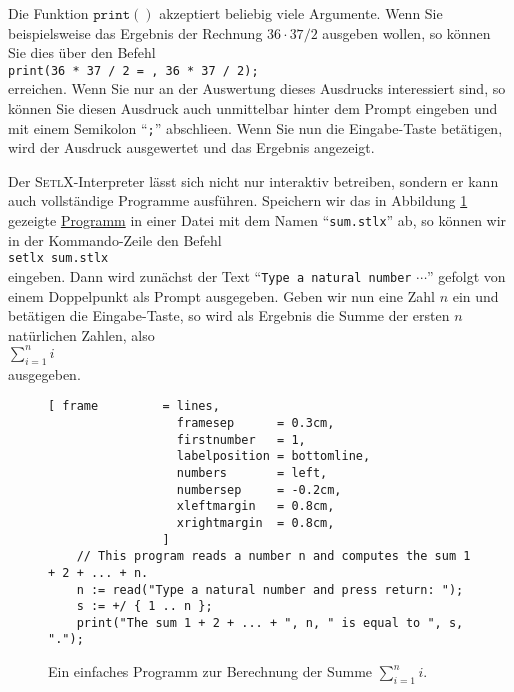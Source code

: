 Die Funktion $\mathtt{print}()$ akzeptiert beliebig viele Argumente.  Wenn Sie
beispielsweise das Ergebnis der Rechnung $36 \cdot 37 / 2$ ausgeben wollen, so k\"{o}nnen Sie dies \"{u}ber den Befehl
\\[0.2cm]
\hspace*{1.3cm}
\texttt{print(36 * 37 / 2 = , 36 * 37 / 2);}
\\[0.2cm]
erreichen.  Wenn Sie nur an der Auswertung dieses Ausdrucks interessiert sind, so k\"{o}nnen Sie diesen 
Ausdruck auch unmittelbar hinter dem Prompt eingeben und mit einem Semikolon ``\texttt{;}'' abschlie\3en.
Wenn Sie nun die Eingabe-Taste bet\"{a}tigen, wird der Ausdruck ausgewertet und das Ergebnis angezeigt.

Der \textsc{SetlX}-Interpreter l\"{a}sst sich nicht nur interaktiv betreiben, sondern er kann auch vollst\"{a}ndige
Programme ausf\"{u}hren.  Speichern wir das in Abbildung \ref{fig:sum.stlx} gezeigte 
\href{https://github.com/karlstroetmann/Logik/blob/master/SetlX/sum.stlx}{Programm} in einer Datei mit
dem Namen ``\texttt{sum.stlx}'' ab, so k\"{o}nnen wir in der Kommando-Zeile den Befehl
\\[0.2cm]
\hspace*{1.3cm}
\texttt{setlx sum.stlx}
\\[0.2cm] 
eingeben.  Dann wird zun\"{a}chst der Text ``\texttt{Type a natural number} $\cdots$'' gefolgt von einem
Doppelpunkt als Prompt ausgegeben.  Geben wir nun eine Zahl $n$ ein und bet\"{a}tigen die Eingabe-Taste, so wird
als Ergebnis die Summe der ersten $n$ nat\"{u}rlichen Zahlen, also
\\[0.2cm]
\hspace*{1.3cm}
$\sum\limits_{i=1}^n i$ 
\\[0.2cm]
ausgegeben.

\begin{figure}[!ht]
\centering
\begin{Verbatim}[ frame         = lines, 
                  framesep      = 0.3cm, 
                  firstnumber   = 1,
                  labelposition = bottomline,
                  numbers       = left,
                  numbersep     = -0.2cm,
                  xleftmargin   = 0.8cm,
                  xrightmargin  = 0.8cm,
                ]
    // This program reads a number n and computes the sum 1 + 2 + ... + n.
    n := read("Type a natural number and press return: ");
    s := +/ { 1 .. n };
    print("The sum 1 + 2 + ... + ", n, " is equal to ", s, ".");
\end{Verbatim}
\vspace*{-0.3cm}
\caption{Ein einfaches Programm zur Berechnung der Summe $\sum\limits_{i=1}^n i$.}
\label{fig:sum.stlx}
\end{figure}


